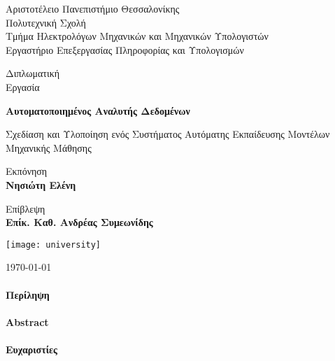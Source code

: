 \begin{titlepage}
	\begin{center}
		\vspace*{1cm}
	\small
	Αριστοτέλειο Πανεπιστήμιο Θεσσαλονίκης\\
	Πολυτεχνική Σχολή\\
	Τμήμα Ηλεκτρολόγων Μηχανικών και Μηχανικών Υπολογιστών\\
	Εργαστήριο Επεξεργασίας Πληροφορίας και Υπολογισμών\\
			
		\vspace{1.5cm}
		
		\LARGE
		Διπλωματική\\
		Εργασία		
		\vspace{0.3cm}
		
		\Huge
		\textbf{Αυτοματοποιημένος Αναλυτής Δεδομένων}
		
		\vspace{0.3cm}
		\LARGE
		Σχεδίαση και Υλοποίηση ενός Συστήματος Αυτόματης Εκπαίδευσης Μοντέλων Μηχανικής Μάθησης
		
		\vspace{1.5cm}
		
		Εκπόνηση \\
		\textbf{Νησιώτη Ελένη}
		
		\vspace{1.5cm}
		
		Επίβλεψη \\
		\textbf{Επίκ. Καθ. Ανδρέας Συμεωνίδης}
		
		
		
		\texttt{[image: university]}
		
			
		\today
		
	\end{center}
\end{titlepage}

{
	\titleformat{\paragraph}[display]{\normalfont\Large\bfseries\centering}{\theparagraph}{1em}{}
	\paragraph{Περίληψη}
	\newpage
	\paragraph{Abstract}
	\newpage
	\paragraph{Ευχαριστίες}
	\newpage
}


\tableofcontents
\listoffigures
\listoftables

